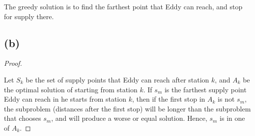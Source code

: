 \documentclass[a4paper,12pt]{article}
\begin{document}
The greedy solution is to find the farthest point that Eddy can reach, and stop for supply there.

\subsection*{(b)}

\begin{proof}
$ $

Let $S_k$ be the set of supply points that Eddy can reach after station $k$, and $A_k$ be the optimal solution of starting from station $k$.
If $s_m$ is the farthest supply point Eddy can reach in he starts from station $k$, 
then if the first stop in $A_k$ is not $s_m$, the subproblem (distances after the first stop) will be longer than the subproblem that chooses $s_m$, and will produce a worse or equal solution.
Hence, $s_m$ is in one of $A_k$.
\end{proof}
\end{document}
